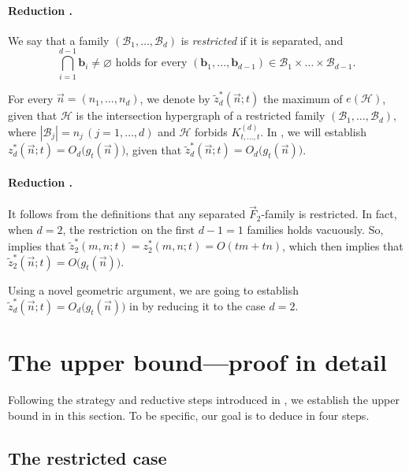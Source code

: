 \documentclass[11pt]{article}
\theoremstyle{definition}
\newcommand*{\cH}{\mathcal{H}}
\newcommand*{\vF}{\vec{F}}
\newcommand*{\cB}{\mathcal{B}}
\newcommand*{\vn}{\vec{n}}
\newcommand*{\wz}{\widetilde{z}}
\begin{document}
\paragraph{Reduction \texorpdfstring{{\MakeUppercase{}}}{III}.} We say that a family $(\cB_1, \dots, \cB_d)$ is \emph{restricted} if it is separated, and
\[
\text{$\bigcap_{i=1}^{d-1} \bm{b}_i \ne \varnothing$ holds for every $(\bm{b}_1, \dots, \bm{b}_{d-1}) \in \cB_1 \times \dots \times \cB_{d-1}$}. 
\]

For every $\vn = (n_1, \dots, n_d)$, we denote by $\wz_d^*(\vn; t)$ the maximum of $e(\cH)$, given that $\cH$ is the intersection hypergraph of a restricted family $(\cB_1, \dots, \cB_d)$, where $|\cB_j| = n_j \, (j = 1, \dots, d)$ and $\cH$ forbids $K_{t, \dots, t}^{(d)}$. 
In , we will establish $z^*_d(\vn; t) = O_d \bigl( g_t(\vn) \bigr)$, given that $\wz_d^*(\vn; t) = O_d \bigl( g_t(\vn) \bigr)$. %

\paragraph{Reduction \texorpdfstring{{\MakeUppercase{}}}{IV}.} 
It follows from the definitions that any separated $\vF_2$-family is restricted. In fact, when $d = 2$, the restriction on the first $d - 1 = 1$ families holds vacuously. So,  implies that $\wz_2^*(m, n; t) = z_2^*(m, n; t) = O(tm + tn)$, which then implies that $\wz_2^*(\vn; t) = O \bigl( g_t(\vn) \bigr)$. 

Using a novel geometric argument, we are going to establish $\wz_d^*(\vn; t) = O_d \bigl( g_t(\vn) \bigr)$ in  by reducing it to the case $d = 2$.

\section{The upper bound---proof in detail} \label{sec:upper_proof}

Following the strategy and reductive steps introduced in , we establish the upper bound in  in this section. To be specific, our goal is to deduce  in four steps. 

\subsection{The restricted case} \label{sec:upper_restricted}
\end{document}
